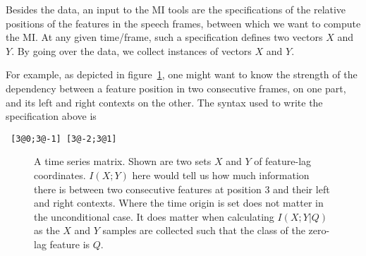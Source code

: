 \documentclass{article}
\begin{document}
Besides the data, an input to the MI tools are the specifications of
the relative positions of the features in the speech frames, between
which we want to compute the MI.  At any given time/frame, such a
specification defines two vectors $X$ and $Y$.  By going over the
data, we collect instances of vectors $X$ and $Y$.

For example, as depicted in figure~\ref{fig:mi-window}, one might want
to know the strength of the dependency between a feature position in
two consecutive frames, on one part, and its left and right contexts
on the other.  The syntax used to write the specification above is
\begin{verbatim} [3@0;3@-1] [3@-2;3@1] \end{verbatim}

\begin{figure}
\center
{}
\caption{\label{fig:mi-window} A time series matrix.  Shown are two
sets $X$ and $Y$ of feature-lag coordinates.  $I(X;Y)$ here would tell
us how much information there is between two consecutive features at
position 3 and their left and right contexts.  Where the time origin
is set does not matter in the unconditional case.  It does matter when
calculating $I(X;Y|Q)$ as the $X$ and $Y$ samples are collected such
that the class of the zero-lag feature is $Q$.}
\end{figure}



\end{document}

